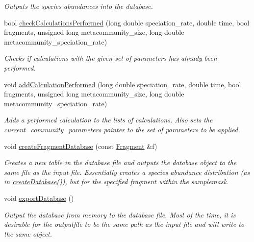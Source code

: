 \begin{DoxyCompactItemize}
\begin{DoxyCompactList}\small\item\em Outputs the species abundances into the database. \end{DoxyCompactList}\item 
bool \hyperlink{class_community_a7a1c541651f7b2326db2334233072d04}{check\+Calculations\+Performed} (long double speciation\+\_\+rate, double time, bool fragments, unsigned long metacommunity\+\_\+size, long double metacommunity\+\_\+speciation\+\_\+rate)
\begin{DoxyCompactList}\small\item\em Checks if calculations with the given set of parameters has already been performed. \end{DoxyCompactList}\item 
void \hyperlink{class_community_a28f6996de89e7596da6777cc55e9861d}{add\+Calculation\+Performed} (long double speciation\+\_\+rate, double time, bool fragments, unsigned long metacommunity\+\_\+size, long double metacommunity\+\_\+speciation\+\_\+rate)
\begin{DoxyCompactList}\small\item\em Adds a performed calculation to the lists of calculations. Also sets the current\+\_\+community\+\_\+parameters pointer to the set of parameters to be applied. \end{DoxyCompactList}\item 
void \hyperlink{class_community_ad6515ff43ea8189a1acdcccfe893bbba}{create\+Fragment\+Database} (const \hyperlink{struct_fragment}{Fragment} \&f)
\begin{DoxyCompactList}\small\item\em Creates a new table in the database file and outputs the database object to the same file as the input file. Essentially creates a species abundance distribution (as in \hyperlink{class_community_ad6e92dafaf00fd65cc29ca436dc61a2e}{create\+Database()}), but for the specified fragment within the samplemask. \end{DoxyCompactList}\item 
void \hyperlink{class_community_a280850bd6077692755cc419028aa5d67}{export\+Database} ()
\begin{DoxyCompactList}\small\item\em Output the database from memory to the database file. Most of the time, it is desirable for the outputfile to be the same path as the input file and will write to the same object. \end{DoxyCompactList}\item 

\end{DoxyCompactItemize}
